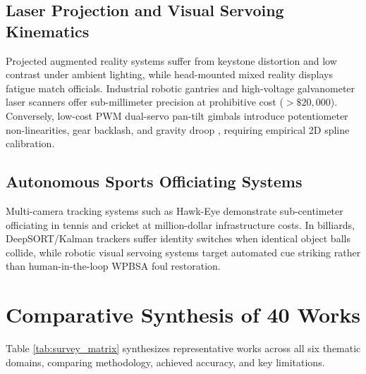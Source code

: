 \documentclass[conference]{IEEEtran}
\begin{document}
\subsection{Laser Projection and Visual Servoing Kinematics}
Projected augmented reality systems \cite{ref8, ref25} suffer from keystone distortion and low contrast under ambient lighting, while head-mounted mixed reality displays \cite{ref26} fatigue match officials. Industrial robotic gantries \cite{ref14, ref15, ref16} and high-voltage galvanometer laser scanners \cite{ref17, ref18} offer sub-millimeter precision at prohibitive cost ($>\$20{,}000$). Conversely, low-cost PWM dual-servo pan-tilt gimbals introduce potentiometer non-linearities, gear backlash, and gravity droop \cite{ref36, ref37}, requiring empirical 2D spline calibration.

\subsection{Autonomous Sports Officiating Systems}
Multi-camera tracking systems such as Hawk-Eye \cite{ref22} demonstrate sub-centimeter officiating in tennis and cricket at million-dollar infrastructure costs. In billiards, DeepSORT/Kalman trackers \cite{ref21} suffer identity switches when identical object balls collide, while robotic visual servoing systems \cite{ref23, ref24} target automated cue striking rather than human-in-the-loop WPBSA foul restoration.

\section{Comparative Synthesis of 40 Works}
Table \ref{tab:survey_matrix} synthesizes representative works across all six thematic domains, comparing methodology, achieved accuracy, and key limitations.
\end{document}
